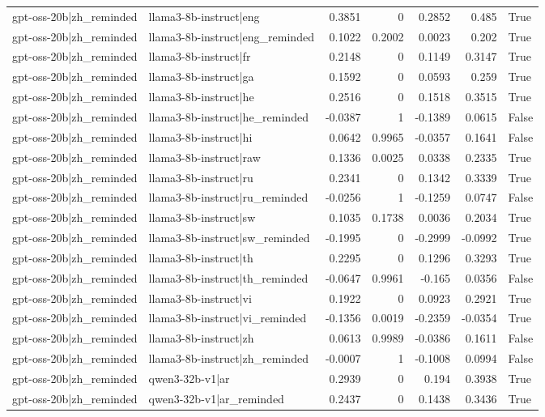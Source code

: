\begin{table}
\begin{tabular}{l l r r r r l}
gpt-oss-20b|zh_reminded & llama3-8b-instruct|eng & 0.3851 & 0 & 0.2852 & 0.485 & True \\
gpt-oss-20b|zh_reminded & llama3-8b-instruct|eng_reminded & 0.1022 & 0.2002 & 0.0023 & 0.202 & True \\
gpt-oss-20b|zh_reminded & llama3-8b-instruct|fr & 0.2148 & 0 & 0.1149 & 0.3147 & True \\
gpt-oss-20b|zh_reminded & llama3-8b-instruct|ga & 0.1592 & 0 & 0.0593 & 0.259 & True \\
gpt-oss-20b|zh_reminded & llama3-8b-instruct|he & 0.2516 & 0 & 0.1518 & 0.3515 & True \\
gpt-oss-20b|zh_reminded & llama3-8b-instruct|he_reminded & -0.0387 & 1 & -0.1389 & 0.0615 & False \\
gpt-oss-20b|zh_reminded & llama3-8b-instruct|hi & 0.0642 & 0.9965 & -0.0357 & 0.1641 & False \\
gpt-oss-20b|zh_reminded & llama3-8b-instruct|raw & 0.1336 & 0.0025 & 0.0338 & 0.2335 & True \\
gpt-oss-20b|zh_reminded & llama3-8b-instruct|ru & 0.2341 & 0 & 0.1342 & 0.3339 & True \\
gpt-oss-20b|zh_reminded & llama3-8b-instruct|ru_reminded & -0.0256 & 1 & -0.1259 & 0.0747 & False \\
gpt-oss-20b|zh_reminded & llama3-8b-instruct|sw & 0.1035 & 0.1738 & 0.0036 & 0.2034 & True \\
gpt-oss-20b|zh_reminded & llama3-8b-instruct|sw_reminded & -0.1995 & 0 & -0.2999 & -0.0992 & True \\
gpt-oss-20b|zh_reminded & llama3-8b-instruct|th & 0.2295 & 0 & 0.1296 & 0.3293 & True \\
gpt-oss-20b|zh_reminded & llama3-8b-instruct|th_reminded & -0.0647 & 0.9961 & -0.165 & 0.0356 & False \\
gpt-oss-20b|zh_reminded & llama3-8b-instruct|vi & 0.1922 & 0 & 0.0923 & 0.2921 & True \\
gpt-oss-20b|zh_reminded & llama3-8b-instruct|vi_reminded & -0.1356 & 0.0019 & -0.2359 & -0.0354 & True \\
gpt-oss-20b|zh_reminded & llama3-8b-instruct|zh & 0.0613 & 0.9989 & -0.0386 & 0.1611 & False \\
gpt-oss-20b|zh_reminded & llama3-8b-instruct|zh_reminded & -0.0007 & 1 & -0.1008 & 0.0994 & False \\
gpt-oss-20b|zh_reminded & qwen3-32b-v1|ar & 0.2939 & 0 & 0.194 & 0.3938 & True \\
gpt-oss-20b|zh_reminded & qwen3-32b-v1|ar_reminded & 0.2437 & 0 & 0.1438 & 0.3436 & True \\

\end{tabular}
\end{table}
